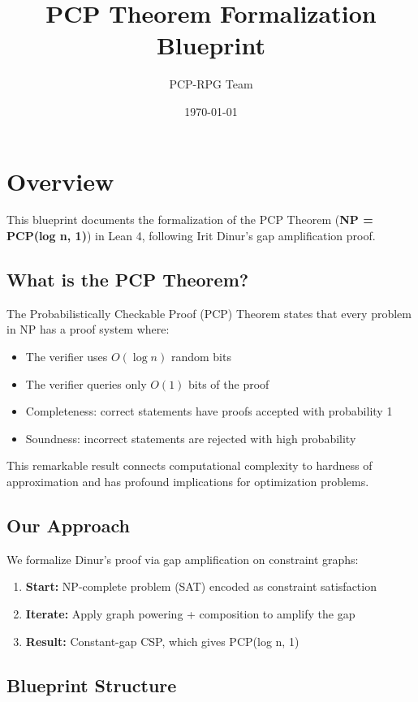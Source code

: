 \documentclass[a4paper]{report}
\title{PCP Theorem Formalization Blueprint}
\author{PCP-RPG Team}
\date{\today}
\begin{document}
\maketitle

\section*{Overview}

This blueprint documents the formalization of the PCP Theorem (\textbf{NP = PCP(log n, 1)}) in Lean 4, following Irit Dinur's gap amplification proof.

\subsection*{What is the PCP Theorem?}

The Probabilistically Checkable Proof (PCP) Theorem states that every problem in NP has a proof system where:
\begin{itemize}
\item The verifier uses $O(\log n)$ random bits
\item The verifier queries only $O(1)$ bits of the proof
\item Completeness: correct statements have proofs accepted with probability 1
\item Soundness: incorrect statements are rejected with high probability
\end{itemize}

This remarkable result connects computational complexity to hardness of approximation and has profound implications for optimization problems.

\subsection*{Our Approach}

We formalize Dinur's proof via gap amplification on constraint graphs:

\begin{enumerate}
\item \textbf{Start:} NP-complete problem (SAT) encoded as constraint satisfaction
\item \textbf{Iterate:} Apply graph powering + composition to amplify the gap
\item \textbf{Result:} Constant-gap CSP, which gives PCP(log n, 1)
\end{enumerate}

\subsection*{Blueprint Structure}
\end{document}
